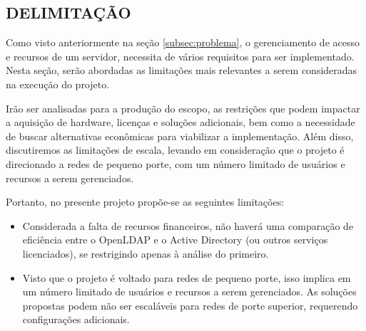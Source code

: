 \subsection{DELIMITAÇÃO}
\label{subsec:delimitação}
Como visto anteriormente na seção \ref{subsec:problema}, o gerenciamento de acesso e recursos de um servidor, necessita de vários requisitos para ser implementado. Nesta seção, serão abordadas as limitações mais relevantes a serem consideradas na execução 
do projeto. 

Irão ser analisadas para a produção do escopo, as restrições que podem impactar a aquisição de hardware, licenças e soluções adicionais, bem como a necessidade de buscar alternativas econômicas para viabilizar a implementação. Além disso, discutiremos as limitações de escala, levando em consideração que o projeto é direcionado a redes de pequeno porte, com um número limitado de usuários e recursos a serem gerenciados.

Portanto, no presente projeto propõe-se as seguintes limitações:

\begin{itemize}
	\item Considerada a falta de recursos financeiros, não haverá uma comparação de eficiência entre o OpenLDAP e o Active Directory (ou outros serviços licenciados), se restrigindo apenas à análise do primeiro.
    \item Visto que o projeto é voltado para redes de pequeno porte, isso implica em um número limitado de usuários e recursos a serem gerenciados. As soluções propostas podem não ser escaláveis para redes de porte superior, requerendo configurações adicionais.
\end{itemize}

